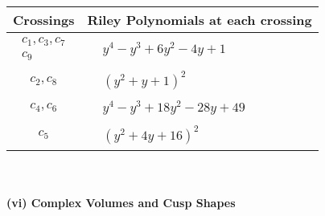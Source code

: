 \documentclass[1p]{elsarticle_modified}
\theoremstyle{definition}
\begin{document}
\begin{tabular}{m{50pt}|m{274pt}}
Crossings & \hspace{64pt}Riley Polynomials at each crossing \\
\hline $$\begin{aligned}c_{1},c_{3},c_{7}\\c_{9}\end{aligned}$$&$\begin{aligned}
&y^4- y^3+6 y^2-4 y+1
\end{aligned}$\\
\hline $$\begin{aligned}c_{2},c_{8}\end{aligned}$$&$\begin{aligned}
&(y^2+y+1)^2
\end{aligned}$\\
\hline $$\begin{aligned}c_{4},c_{6}\end{aligned}$$&$\begin{aligned}
&y^4- y^3+18 y^2-28 y+49
\end{aligned}$\\
\hline $$\begin{aligned}c_{5}\end{aligned}$$&$\begin{aligned}
&(y^2+4 y+16)^2
\end{aligned}$\\
\hline
\end{tabular}\\~\\
\newpage\flushleft \textbf{(vi) Complex Volumes and Cusp Shapes}
\end{document}
